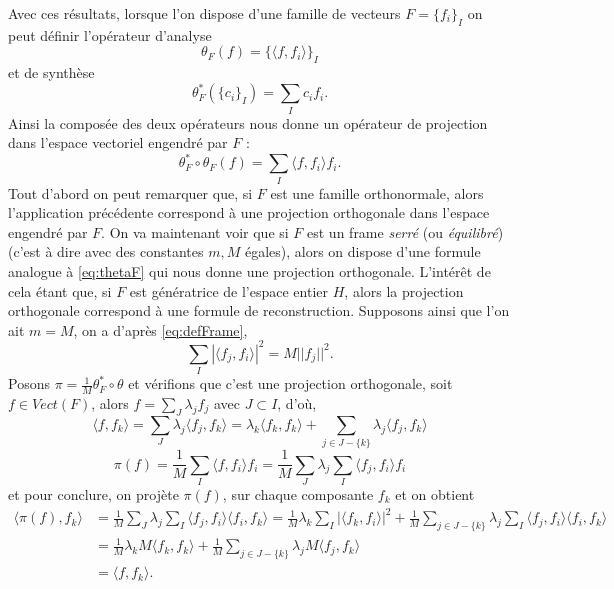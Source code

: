 Avec ces résultats, lorsque l'on dispose d'une famille de vecteurs $F = \{f_i\}_I$ on peut définir l'opérateur d'analyse
\begin{equation*}
	\theta_F (f) = \{\langle f, f_i \rangle\}_I 
\end{equation*}
et de synthèse
\begin{equation*}
	\theta^*_F( \{c_i\}_I) = \sum_I c_i f_i.  
\end{equation*}
Ainsi la composée des deux opérateurs nous donne un opérateur de projection dans l'espace vectoriel engendré par $F$ :
\begin{equation}\label{eq:thetaF}
	\theta^*_F \circ \theta_F (f) = \sum_I \langle f, f_i\rangle f_i. 
\end{equation}
Tout d'abord on peut remarquer que, si $F$ est une famille orthonormale, alors l'application précédente correspond à une projection orthogonale dans l'espace engendré par $F$.
On va maintenant voir que si $F$ est un frame \textit{serré} (ou \textit{équilibré}) (c'est à dire avec des constantes $m, M$ égales), alors on dispose d'une formule analogue à \ref{eq:thetaF} qui nous donne une projection orthogonale.
L'intérêt de cela étant que, si $F$ est génératrice de l'espace entier $H$, alors la projection orthogonale correspond à une formule de reconstruction.
\newline
Supposons ainsi que l'on ait $m=M$, on a d'après \ref{eq:defFrame}, 
\begin{equation*}
	\sum_I |\langle f_j, f_i \rangle |^2 = M||f_j||^2.
\end{equation*}
Posons $\pi = \frac{1}{M}\theta^*_F \circ \theta$ et vérifions que c'est une projection orthogonale, soit $f\in Vect(F)$, alors
$f = \sum_J \lambda_j f_j$ avec $J\subset I$, d'où,
\begin{equation*}
	\langle f, f_k \rangle = \sum_J \lambda_j \langle f_j, f_k \rangle = \lambda_k \langle f_k, f_k \rangle + \sum_{j \in J-\{k\}} \lambda_j \langle f_j, f_k \rangle  
\end{equation*}
\begin{equation*}
	\pi(f) = \frac{1}{M}\sum_I \langle f, f_i \rangle f_i 
	= \frac{1}{M}\sum_J \lambda_j \sum_I \langle f_j, f_i \rangle f_i  
\end{equation*}
et pour conclure, on projète $\pi(f)$, sur chaque composante $f_k$ et on obtient
\begin{align*}
	\langle \pi(f), f_k \rangle &= \frac{1}{M} \sum_J \lambda_j \sum_I \langle f_j, f_i \rangle \langle f_i, f_k \rangle 
	= \frac{1}{M}  \lambda_k \sum_I |\langle f_k, f_i\rangle|^2 + \frac{1}{M} \sum_{j \in J-\{k\}}\lambda_j \sum_I  \langle f_j, f_i \rangle \langle f_i, f_k \rangle \\
	&= \frac{1}{M} \lambda_k M \langle f_k, f_k \rangle + \frac{1}{M} \sum_{j \in J-\{k\}} \lambda_j M\langle f_j, f_k \rangle \\
	&= \langle f, f_k \rangle.
\end{align*}
